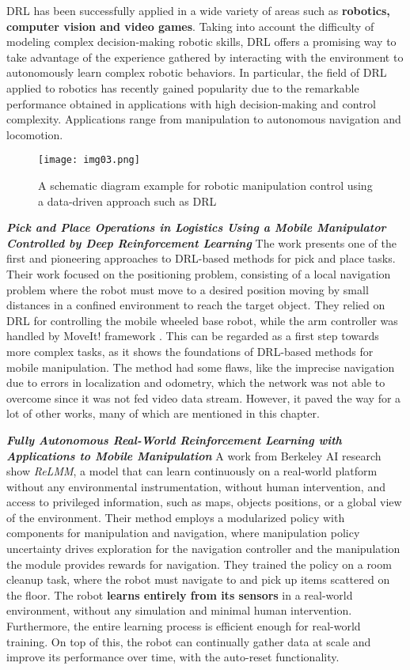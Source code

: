DRL has been successfully applied in a wide variety of areas such as \textbf{robotics, computer vision and video games}.
Taking into account the difficulty of modeling complex decision-making robotic skills, DRL offers
a promising way to take advantage of the experience gathered by interacting with the environment to
autonomously learn complex robotic behaviors. In particular, the field of DRL applied to robotics has
recently gained popularity due to the remarkable performance obtained in applications
with high decision-making and control complexity.
Applications range from manipulation to autonomous navigation and locomotion.
\cite{iriondo2023learning}

\begin{figure}[t]
	\centering
	\texttt{[image: img03.png]}
	\captionsetup{width=0.8\linewidth}
	\caption{A schematic diagram example for robotic manipulation control
		using a data-driven approach such as DRL \cite{liu2021deep}}
	\label{fig:img03}
\end{figure}

\textbf{\textit{Pick and Place Operations in Logistics Using
		a Mobile Manipulator Controlled by Deep
		Reinforcement Learning}} \quad
The work \cite{iriondo2019pickandplace} presents one of the first and pioneering approaches
to DRL-based methods for pick and place tasks. Their work focused on the positioning
problem, consisting of a local navigation problem where the robot must move to a desired
position moving by small distances in a confined environment to reach the target object.
They relied on DRL for controlling the mobile wheeled base robot, while the arm controller
was handled by MoveIt! framework \cite{moveit2}. This can be regarded as a first step towards
more complex tasks, as it shows the foundations of DRL-based methods for mobile manipulation.
The method had some flaws, like the imprecise navigation due to errors in localization and
odometry, which the network was not able to overcome since it was not fed video data stream.
However, it paved the way for a lot of other works, many of which are mentioned in this chapter.

\textbf{\textit{Fully Autonomous Real-World Reinforcement
		Learning with Applications to Mobile Manipulation}} \quad
A work from Berkeley AI research \cite{sun2022relmm} show \textit{ReLMM}, a model that
can learn continuously on a real-world platform without any environmental instrumentation,
without human intervention, and access to privileged information, such as maps,
objects positions, or a global view of the environment. Their method employs a modularized policy
with components for manipulation and navigation, where manipulation
policy uncertainty drives exploration for the navigation controller and the manipulation
the module provides rewards for navigation. They trained the policy on a room cleanup task, where
the robot must navigate to and pick up items scattered on the floor.
The robot \textbf{learns entirely from its sensors} in a real-world environment, without any
simulation and minimal human intervention. Furthermore, the entire learning process is efficient
enough for real-world training. On top of this, the robot can continually gather data
at scale and improve its performance over time, with the auto-reset functionality.

